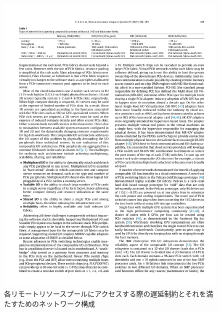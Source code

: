 \documentclass[a4j]{ujarticle}
\begin{document}
\begin{figure}[htbp]
  \centering
  \includegraphics[width=1.0\hsize]{network_data.pdf}
  \caption{各リモートリソースプールにアクセスする際の遅延制約とそれを満たすためのネットワーク構成}
  \label{network_data}
\end{figure}

\clearpage
\end{document}
